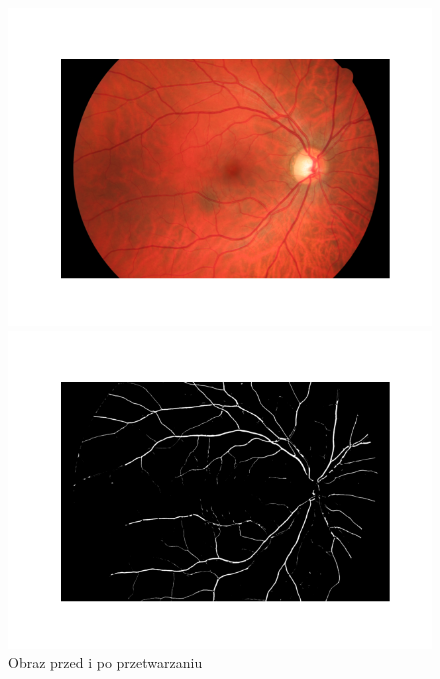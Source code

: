 \documentclass{article}
\begin{document}
\begin{enumerate}
\begin{enumerate}
\begin{enumerate}
\begin{figure}[h]
\begin{minipage}{0.47\textwidth}
                                      \includegraphics[width=\linewidth]{../res/sample-original-image.png}
                                  \end{minipage}
                                  \begin{minipage}{0.47\textwidth}
                                      \centering
                                      \includegraphics[width=\linewidth]{../res/sample-preprocessed-image.png}
                                  \end{minipage}
                                  \caption{Obraz przed i po przetwarzaniu}
                              \end{figure}
                    \end{enumerate}

\end{enumerate}
\end{enumerate}
\end{document}
